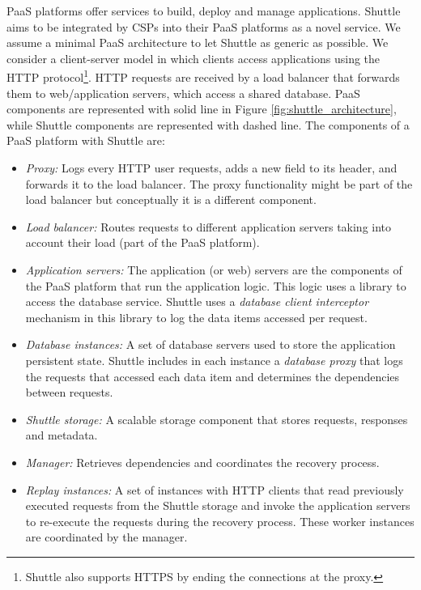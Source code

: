 \ac{PaaS} platforms offer services to build, deploy and manage applications. Shuttle aims to be integrated by CSPs into their \ac{PaaS} platforms as a novel service. 
We assume a minimal \ac{PaaS} architecture to let Shuttle as generic as possible. We consider a client-server model in which clients access applications using the HTTP protocol\footnote{Shuttle also supports HTTPS by ending the connections at the proxy.}. HTTP requests are received by a load balancer that forwards them to web/application servers, which access a shared database. {PaaS} components are represented with solid line in Figure \ref{fig:shuttle_architecture}, while Shuttle components are represented with dashed line. The components of a \ac{PaaS} platform with Shuttle are:

\begin{itemize}
  \item \textit{Proxy:} Logs every HTTP user requests, adds a new field to its header, and forwards it to the load balancer. The proxy functionality might be part of the load balancer but conceptually it is a different component.%
  \item \textit{Load balancer:} Routes requests to different application servers taking into account their load (part of the \ac{PaaS} platform).
  \item \textit{Application servers:} The application (or web) servers are the components of the \ac{PaaS} platform that run the application logic. This logic uses a library to access the database service. Shuttle uses a \textit{database client interceptor} mechanism in this library to log the data items accessed per request.
  \item \textit{Database instances:} A set of database servers used to store the application persistent state. Shuttle includes in each instance  a \textit{database proxy} that logs the requests that accessed each data item and determines the dependencies between requests.
  \item \textit{Shuttle storage:} A scalable storage component that stores requests, responses and metadata.
  \item \textit{Manager:} Retrieves dependencies and coordinates the recovery process. 
  \item \textit{Replay instances:} A set of instances with HTTP clients that read previously executed requests from the Shuttle storage and invoke the application servers to re-execute the requests during the recovery process. These worker instances are coordinated by the manager.
\end{itemize}

